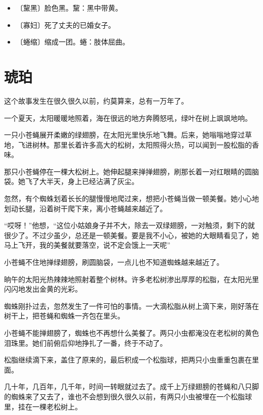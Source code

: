 \documentclass[12pt,UTF-8,openany]{ctexbook}
\begin{document}
\begin{itemize}
    \setlength\itemsep{-0.2em}
    \item 〔黧黑〕脸色黑。黧：黑中带黄。
    \item 〔寡妇〕死了丈夫的已婚女子。
    \item 〔蜷缩〕缩成一团。蜷：肢体屈曲。
\end{itemize}

\chapter{琥珀}

\begin{large}
    
    这个故事发生在很久很久以前，约莫算来，总有一万年了。
    
    一个夏天，太阳暖暖地照着，海在很远的地方奔腾怒吼，绿叶在树上飒飒地响。
    
    一只小苍蝇展开柔嫩的绿翅膀，在太阳光里快乐地飞舞。后来，她嗡嗡地穿过草地，飞进树林。那里长着许多高大的松树，太阳照得火热，可以闻到一股松脂的香味。
    
    那只小苍蝇停在一棵大松树上。她伸起腿来掸掸翅膀，刷那长着一对红眼睛的圆脑袋。她飞了大半天，身上已经沾满了灰尘。
    
    忽然，有个蜘蛛划着长长的腿慢慢地爬过来，想把小苍蝇当做一顿美餐。她小心地划动长腿，沿着树干爬下来，离小苍蝇越来越近了。
    
    “哎呀！”他想，“这位小姑娘身子并不大，除去一双绿翅膀，一对触须，剩下的就很少了。不过少虽少，总还是一顿美餐。要是我不小心，被她的大眼睛看见了，她马上飞开，我的美餐就要落空，说不定会饿上一天呢”
    
    小苍蝇不住地掸绿翅膀，刷圆脑袋，一点儿也不知道蜘蛛越来越近了。
    
    晌午的太阳光热辣辣地照射着整个树林。许多老松树渗出厚厚的松脂，在太阳光里闪闪地发出金黄的光彩。
    
    蜘蛛刚扑过去，忽然发生了一件可怕的事情。一大滴松脂从树上滴下来，刚好落在树干上，把苍蝇和蜘蛛一齐包在里头。
    
    小苍蝇不能掸翅膀了，蜘蛛也不再想什么美餐了。两只小虫都淹没在老松树的黄色泪珠里。她们前俯后仰地挣扎了一番，终于不动了。
    
    松脂继续滴下来，盖住了原来的，最后积成一个松脂球，把两只小虫重重包裹在里面。
    
    几十年，几百年，几千年，时间一转眼就过去了。成千上万绿翅膀的苍蝇和八只脚的蜘蛛来了又去了，谁也不会想到很久很久以前，有两只小虫被埋在一个松脂球里，挂在一棵老松树上。
    

\end{large}
\end{document}

